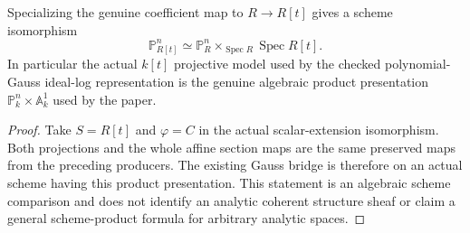\begin{theorem}
\label{projective:actual-polynomial-line-product}
\leanok
{}
Specializing the genuine coefficient map to $R\to R[t]$ gives a scheme
isomorphism
\[
 \mathbb P^n_{R[t]}\simeq
 \mathbb P^n_R\times_{\operatorname{Spec}R}\operatorname{Spec}R[t].
\]
In particular the actual $k[t]$ projective model used by the checked
polynomial-Gauss ideal-log representation is the genuine algebraic product
presentation $\mathbb P^n_k\times\mathbb A^1_k$ used by the paper.
\end{theorem}
\begin{proof}
Take $S=R[t]$ and $\varphi=C$ in the actual scalar-extension isomorphism.
Both projections and the whole affine section maps are the same preserved
maps from the preceding producers. The existing Gauss bridge is therefore
on an actual scheme having this product presentation. This statement is an
algebraic scheme comparison and does not identify an analytic coherent
structure sheaf or claim a general scheme-product formula for arbitrary
analytic spaces.
\end{proof}
